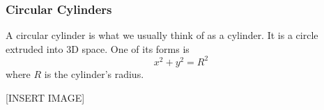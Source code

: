 \subsubsection{Circular Cylinders}
\noindent
A circular cylinder is what we usually think of as a cylinder. It is a circle extruded into 3D space. One of its forms is 
\begin{equation*}
	x^2 + y^2 = R^2	
\end{equation*}
where $R$ is the cylinder's radius.

[INSERT IMAGE]